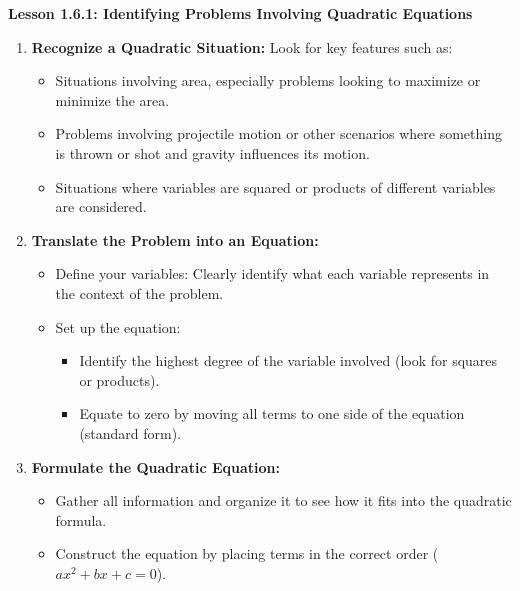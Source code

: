 \begin{center}
\textbf{Lesson 1.6.1: Identifying Problems Involving Quadratic Equations}
\end{center}

\vspace*{1ex}



\begin{enumerate}[label = \color{blue}\arabic*. ]
\item \textbf{Recognize a Quadratic Situation:} Look for key features such as:
\begin{itemize}
\item Situations involving area, especially problems looking to maximize or minimize the area.
\item Problems involving projectile motion or other scenarios where something is thrown or shot and gravity influences its motion.
\item Situations where variables are squared or products of different variables are considered.
\end{itemize}
\item \textbf{Translate the Problem into an Equation:} 

\begin{itemize}
\item Define your variables: Clearly identify what each variable represents in the context of the problem. 
\item Set up the equation: 
\begin{itemize}
\item Identify the highest degree of the variable involved (look for squares or products).
\item Equate to zero by moving all terms to one side of the equation (standard form).
\end{itemize}
\end{itemize}
\item \textbf{Formulate the Quadratic Equation:}
\begin{itemize}
\item Gather all information and organize it to see how it fits into the quadratic formula.
\item Construct the equation by placing terms in the correct order ($ax^2 + bx + c = 0$).
\end{itemize}
\end{enumerate}


